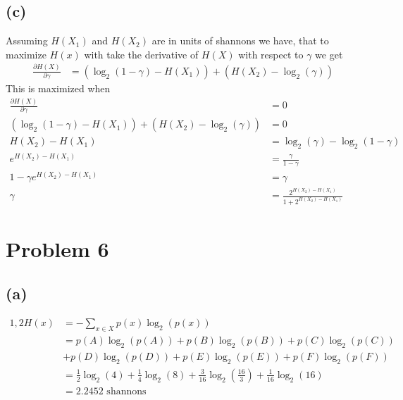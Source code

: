\subsection*{(c)}
Assuming $H(X_1)$ and $H(X_2)$ are in units of shannons we have, that to maximize $H(x)$ with take the derivative of $H(X)$ with respect to $\gamma$ we get
\begin{align*}
	\frac{\partial H(X)}{\partial \gamma}&=(\log_2(1-\gamma)-H(X_1))+(H(X_2)-\log_2(\gamma))
\end{align*}
This is maximized when 
\begin{align*}
	\frac{\partial H(X)}{\partial \gamma}&=0\\
	(\log_2(1-\gamma)-H(X_1))+(H(X_2)-\log_2(\gamma))&=0\\
	H(X_2)-H(X_1)&=\log_2(\gamma)-\log_2(1-\gamma)\\
	e^{H(X_2)-H(X_1)}&=\frac{\gamma}{1-\gamma}\\
	{1-\gamma}e^{H(X_2)-H(X_1)}&=\gamma\\
	\gamma&=\boxed{\frac{2^{H(X_2)-H(X_1)}}{1+2^{H(X_2)-H(X_1)}}}
\end{align*}


\section*{Problem 6}
\subsection*{(a)}
\begin{align*}1,2
	H(x)&=-\sum_{x\in X} p(x)\log_2(p(x))\\
	&=p(A)\log_2(p(A))+p(B)\log_2(p(B))+p(C)\log_2(p(C))\\&+p(D)\log_2(p(D))+p(E)\log_2(p(E))+p(F)\log_2(p(F))\\
	&=\frac{1}{2}\log_2(4)+\frac{1}{4}\log_2(8)+\frac{3}{16}\log_2(\frac{16}{3})+\frac{1}{16}\log_2(16)\\
	&=\boxed{2.2452\text{ shannons}}
\end{align*}

